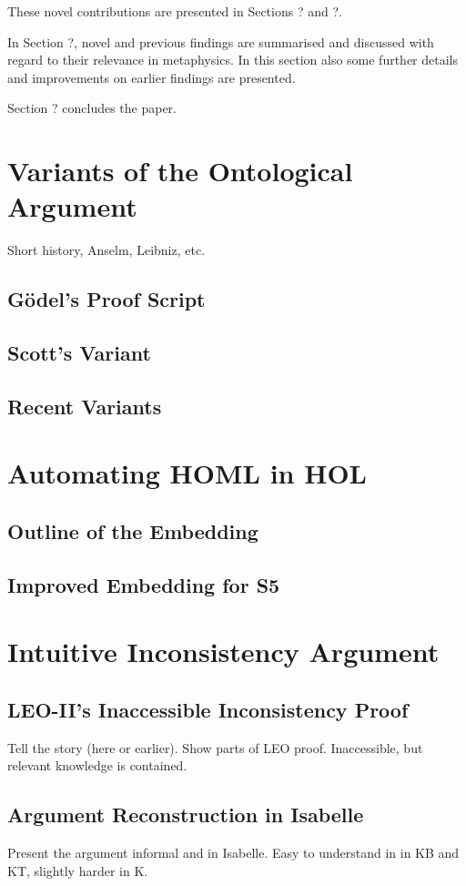 \documentclass{article}
\begin{document}
These novel contributions are presented in Sections ? and ?.

In Section ?, novel and previous findings are summarised and discussed 
with regard to their relevance in metaphysics. In this section also 
some further details and improvements on earlier 
findings are presented.

Section ? concludes the paper.



\section{Variants of the Ontological Argument}
Short history, Anselm, Leibniz, etc.
\subsection{G\"{o}del's Proof Script}
\subsection{Scott's Variant}
\subsection{Recent Variants}

\section{Automating HOML in HOL}
\subsection{Outline of the Embedding}
\subsection{Improved Embedding for S5}

\section{Intuitive Inconsistency Argument}
\subsection{LEO-II's Inaccessible Inconsistency Proof}
Tell the story (here or earlier). Show parts of LEO proof.  Inaccessible, but relevant knowledge
is contained.

\subsection{Argument Reconstruction in Isabelle}
Present the argument informal and in Isabelle. Easy to understand in 
in KB and KT, slightly harder in K.
\end{document}
